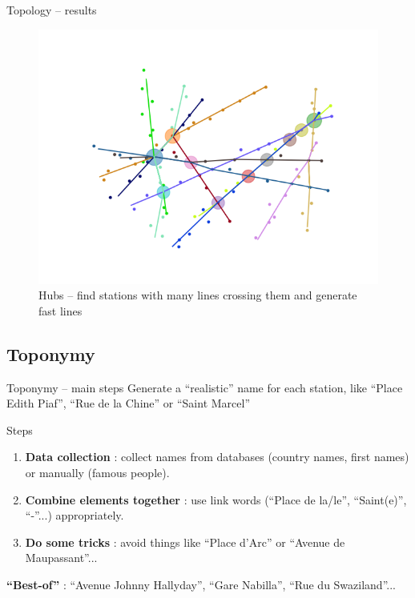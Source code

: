 \begin{frame}{Topology -- results}
	\begin{figure}
		\centering
		\includegraphics[width=0.7\linewidth]{images/net_7.png}
		\caption{Hubs -- find stations with many lines crossing them and generate fast lines}
	\end{figure}
\end{frame}


\subsection{Toponymy}
\begin{frame}{Toponymy -- main steps}
	Generate a ``realistic'' name for each station, like ``Place Edith Piaf'', ``Rue de la Chine'' or ``Saint Marcel''
	\begin{block}{Steps}
		\begin{enumerate}
			\item \textbf{Data collection} : collect names from databases (country names, first names) or manually (famous people).
			\item \textbf{Combine elements together} : use link words (``Place de la/le'', ``Saint(e)'', ``-''...) appropriately.
			\item \textbf{Do some tricks} : avoid things like ``Place d'Arc'' or ``Avenue de Maupassant''... 
		\end{enumerate}
	\end{block}
	\textbf{``Best-of''} : ``Avenue Johnny Hallyday'', ``Gare Nabilla'', ``Rue du Swaziland''...
\end{frame}

